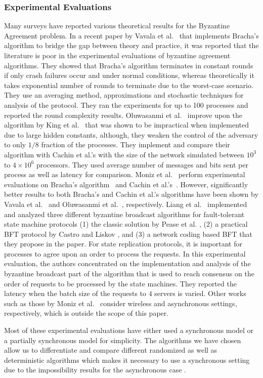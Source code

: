 \subsubsection{Experimental Evaluations} Many surveys have reported various
theoretical results for the Byzantine Agreement problem. In a recent paper by
Vavala et al.~\cite{VN12} that implements Bracha's algorithm \cite{Bracha84} to
bridge the gap between theory and practice, it was reported that the literature
is poor in the experimental evaluations of byzantine agreement algorithms. They
showed that Bracha's algorithm terminates in constant rounds if only crash
failures occur and under normal conditions, whereas theoretically it takes
exponential number of rounds to terminate due to the worst-case scenario. They
use an averaging method, approximations and stochastic techniques for analysis
of the protocol. They ran the experiments for up to 100 processes and reported
the round complexity results. Oluwasanmi et al.~\cite{OSK10} improve
upon the algorithm by King et al.~\cite{KS09} that was shown to be impractical when
implemented due to large hidden constants, although, they weaken the control of
the adversary to only $1/8$ fraction of the processes. They implement and
compare their algorithm with Cachin et al.'s \cite{CKS05} with the size of the
network simulated between $10^3$ to $4\times10^6$ processors. They used average
number of messages and bits sent per process as well as latency for comparison.
Moniz et al.~\cite{MNCV06} perform experimental evaluations on Bracha's
algorithm~\cite{Bracha84} and Cachin et al.'s~\cite{CKS05}. However,
significantly better results to both Bracha's and Cachin et al.'s algorithms
have been shown by Vavala et al.~\cite{VN12} and Oluwasanmi et
al.~\cite{OSK10}, respectively. Liang et al.~\cite{LSV12} implemented and
analyzed three different byzantine broadcast algorithms for fault-tolerant
state machine protocols (1) the classic solution by Pease et al.
\cite{PeaseSL80}, (2) a practical BFT protocol by Castro and Liskov \cite{CL02},
and (3) a network coding based BFT that they propose in the paper. For state
replication protocols, it is important for processes to agree upon an order to
process the requests. In this experimental evaluation, the authors concentrated
on the implementation and analysis of the byzantine broadcast part of the
algorithm that is used to reach consensus on the order of requests to be
processed by the state machines. They reported the latency when the batch size
of the requests to $4$ servers is varied. Other works such as those by Moniz et
al.~\cite{MNC10, MNCV11} consider wireless and asynchronous settings,
respectively, which is outside the scope of this paper.

Most of these experimental evaluations have either used a synchronous model or
a partially synchronous model for simplicity. The algorithms we have chosen
allow us to differentiate and compare different randomized as well as
deterministic algorithms which makes it necessary to use a synchronous setting
due to the impossibility results for the asynchronous case \cite{FischerLP83}. 

